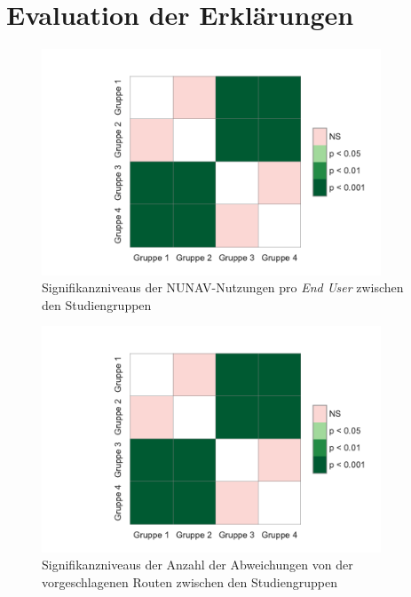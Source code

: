 \chapter{Evaluation der Erklärungen}
\label{sec:appendix_study_results}

\begin{figure}
    \centering
    \includegraphics[width=0.9\textwidth]{contents/06_model_evaluation/02_evaluation/res/usage_result_significance.pdf}
    \caption{Signifikanzniveaus der NUNAV-Nutzungen pro \textit{End User} zwischen den Studiengruppen}
\end{figure}

\begin{figure}
    \centering
    \includegraphics[width=0.9\textwidth]{contents/06_model_evaluation/02_evaluation/res/usage_result_significance.pdf}
    \caption{Signifikanzniveaus der Anzahl der Abweichungen von der vorgeschlagenen Routen zwischen den Studiengruppen}
\end{figure}

